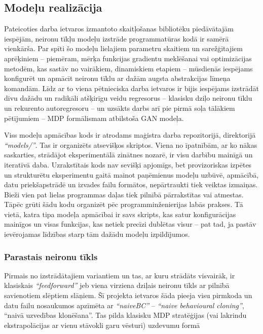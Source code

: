 \documentclass[12pt, a4paper]{article}
\numberwithin{equation}{section} %
\begin{document}
\subsection{Modeļu realizācija}

Pateicoties darba ietvaros izmantoto skaitļošanas bibliotēku piedāvātajām iespējām, neironu tīkļu modeļu izstrāde programmatūras kodā ir samērā vienkārša. Par spīti šo modeļu lielajiem parametru skaitiem un sarežģītajiem aprēķiniem -- piemēram, mērķa funkcijas gradientu meklēšanai vai optimizācijas metodēm, kas sastāv no vairākiem, dinamiskiem etapiem -- mūsdienās iespējams konfigurēt un apmācīt neironu tīklu ar dažām augsta abstrakcijas līmeņa komandām. Līdz ar to viena pētnieciska darba ietvaros ir bijis iespējams izstrādāt divu dažādu un radikāli atšķirīgu veidu regresorus -- klasisku dziļo neironu tīklu un rekurento autoregresoru -- un uzsākts darbs arī pie pirmā soļa tālākiem pētījumiem -- MDP formālismam atbilstoša GAN modeļa. 

Viss modeļu apmācības kods ir atrodams maģistra darba repozitorijā, direktorijā \textit{``models/''}. Tas ir organizēts atsevišķos skriptos. Viena no īpatnībām, ar ko nākas saskarties, strādājot eksperimentālā zinātnes nozarē, ir visu darbību mainīgā un iteratīvā daba. Uzrakstītais kods nav sevišķi apjomīgs, bet provizoriskas izpētes un strukturētu eksperimentu gaitā mainot paņēmienus modeļu uzbūvē, apmācībā, datu priekšapstrādē un izvades failu formātos, nepārtraukti tiek veiktas izmaiņas. Bieži vien pat lielas programmas daļas tiek pilnībā pārrakstītas vai atmestas. Tāpēc grūti šādu kodu organizēt pēc programminženierijas labās prakses. Tā vietā, katra tipa modeļa apmācībai ir savs skripts, kas satur konfigurācijas mainīgos un visas funkcijas, kas netiek precīzi dublētas visur -- pat tad, ja pastāv ievērojamas līdzības starp tām dažādu modeļu izpildījumos. 

\subsubsection{Parastais neironu tīkls}

Pirmais no izstrādātajiem variantiem un tas, ar kuru strādāts visvairāk, ir klasiskais \textit{``feedforward''} jeb viena virziena dziļais neironu tīkls ar pilnībā savienotiem slēptiem slāņiem. Šī projekta ietvaros šāda pieeja visu pirmkoda un datu failu nosaukumos apzīmēta ar \textit{``naiveBC''} -- \textit{``naive behavioural cloning''}, ``naivā uzvedības klonēšana''. Tas pilda klasisku MDP stratēģijas (vai lakrindu ekstrapolācijas ar vienu stāvokli garu vēsturi) uzdevumu formā
\end{document}
